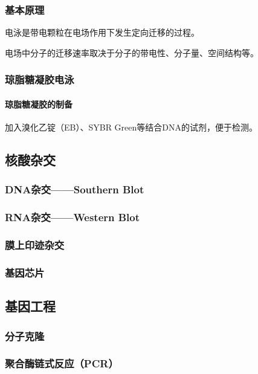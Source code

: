 \subsubsection{基本原理}

电泳是带电颗粒在电场作用下发生定向迁移的过程。

电场中分子的迁移速率取决于分子的带电性、分子量、空间结构等。

\subsubsection{琼脂糖凝胶电泳}

\paragraph{琼脂糖凝胶的制备}

加入溴化乙锭（EB）、SYBR Green等结合DNA的试剂，便于检测。

\subsection{核酸杂交}

\subsubsection{DNA杂交——Southern Blot}


\subsubsection{RNA杂交——Western Blot}

\subsubsection{膜上印迹杂交}

\subsubsection{基因芯片}

\subsection{基因工程}

\subsubsection{分子克隆}

\subsubsection{聚合酶链式反应（PCR）}

